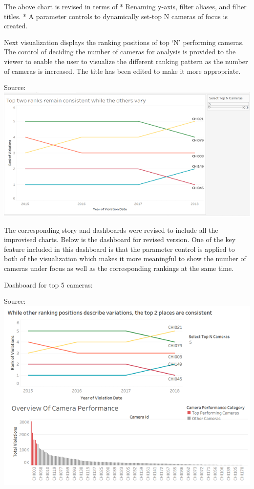 \documentclass[]{book}
\begin{document}
The above chart is revised in terms of
* Renaming y-axis, filter aliases, and filter titles.
* A parameter controls to dynamically set-top N cameras of focus is created.

Next visualization displays the ranking positions of top `N' performing cameras. The control of deciding the number of cameras for analysis is provided to the viewer to enable the user to visualize the different ranking pattern as the number of cameras is increased. The title has been edited to make it more appropriate.

Source:\citep{revised}
\includegraphics{images/Rev_img6.png}

The corresponding story and dashboards were revised to include all the improvised charts. Below is the dashboard for revised version. One of the key feature included in this dashboard is that the parameter control is applied to both of the visualization which makes it more meaningful to show the number of cameras under focus as well as the corresponding rankings at the same time.

Dashboard for top 5 cameras:

Source: \citep{revised}
\includegraphics{images/Rev_img7.png}
\end{document}

